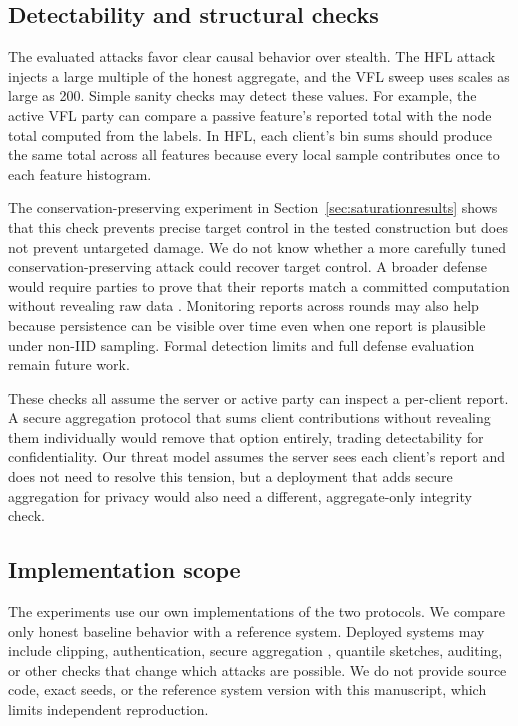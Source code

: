 \documentclass[11pt]{article}
\begin{document}
\subsection{Detectability and structural checks}

The evaluated attacks favor clear causal behavior over stealth. The HFL attack injects a large multiple of the honest aggregate, and the VFL sweep uses scales as large as 200. Simple sanity checks may detect these values. For example, the active VFL party can compare a passive feature's reported total with the node total computed from the labels. In HFL, each client's bin sums should produce the same total across all features because every local sample contributes once to each feature histogram.

The conservation-preserving experiment in Section~\ref{sec:saturationresults} shows that this check prevents precise target control in the tested construction but does not prevent untargeted damage. We do not know whether a more carefully tuned conservation-preserving attack could recover target control. A broader defense would require parties to prove that their reports match a committed computation without revealing raw data \cite{xu2020verifynet}. Monitoring reports across rounds may also help because persistence can be visible over time even when one report is plausible under non-IID sampling. Formal detection limits and full defense evaluation remain future work.

These checks all assume the server or active party can inspect a per-client report. A secure aggregation protocol that sums client contributions without revealing them individually \cite{bonawitz2017secureagg} would remove that option entirely, trading detectability for confidentiality. Our threat model assumes the server sees each client's report and does not need to resolve this tension, but a deployment that adds secure aggregation for privacy would also need a different, aggregate-only integrity check.

\subsection{Implementation scope}

The experiments use our own implementations of the two protocols. We compare only honest baseline behavior with a reference system. Deployed systems may include clipping, authentication, secure aggregation \cite{bonawitz2017secureagg}, quantile sketches, auditing, or other checks that change which attacks are possible. We do not provide source code, exact seeds, or the reference system version with this manuscript, which limits independent reproduction.
\end{document}

